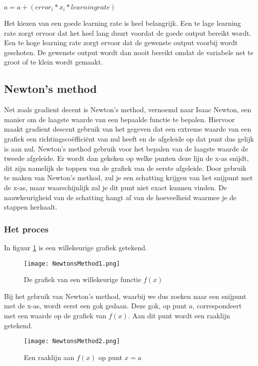 \begin{center}
$ a = a + (error_i * x_i * learning rate)$
\end{center}

Het kiezen van een goede learning rate is heel belangrijk. Een te lage learning rate zorgt ervoor dat het heel lang duurt voordat de goede output bereikt wordt. Een te hoge learning rate zorgt ervoor dat de gewenste output voorbij wordt geschoten. De gewenste output wordt dan nooit bereikt omdat de variabele net te groot of te klein wordt gemaakt. \cite{GradientDescent1}\cite{GradientDescent2}

\subsection{Newton's method}
Net zoals gradient decent is Newton's method, vernoemd naar Isaac Newton, een manier om de laagste waarde van een bepaalde functie te bepalen. Hiervoor maakt gradient descent gebruik van het gegeven dat een extreme waarde van een grafiek een richtingsco\"effici\"ent van nul heeft en de afgeleide op dat punt dus gelijk is aan nul. Newton's method gebruik voor het bepalen van de laagste waarde de tweede afgeleide. Er wordt dan gekeken op welke punten deze lijn de x-as snijdt, dit zijn namelijk de toppen van de grafiek van de eerste afgeleide. Door gebruik te maken van Newton's method, zul je een schatting krijgen van het snijpunt met de x-as, maar waarschijnlijk zal je dit punt niet exact kunnen vinden. De nauwkeurigheid van de schatting hangt af van de hoeveelheid waarmee je de stappen herhaalt.

\subsubsection{Het proces}
In figuur \ref{fig:NM1} is een willekeurige grafiek getekend.

\begin{figure}[H]
  \centering
    \texttt{[image: NewtonsMethod1.png]}
  \caption{De grafiek van een willekeurige functie $ f(x) $}
  \label{fig:NM1}
\end{figure}

Bij het gebruik van Newton's method, waarbij we dus zoeken naar een snijpunt met de x-as, wordt eerst een gok gedaan. Deze gok, op punt $a$, correspondeert met een waarde op de grafiek van $ f(x) $. Aan dit punt wordt een raaklijn getekend.

\begin{figure}[H]
  \centering
    \texttt{[image: NewtonsMethod2.png]}
  \caption{Een raaklijn aan $ f(x) $ op punt $ x = a $}
  \label{fig:NM2}
\end{figure}

